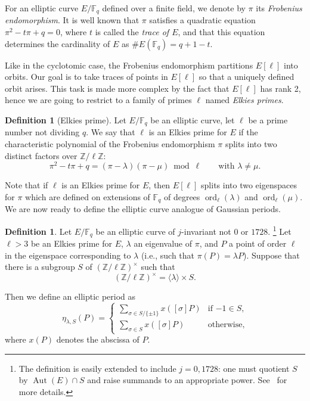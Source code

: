 \documentclass{mcom-l}
\theoremstyle{plain}
\theoremstyle{definition}
\newtheorem{definition}[theorem]{Definition}
\DeclareMathOperator{\order}{ord} %
\DeclareMathOperator{\Aut}{Aut}
\newcommand{\Z}{\ensuremath{\mathbb{Z}}}
\newcommand{\F}{\ensuremath{\mathbb{F}}}
\begin{document}
For an elliptic curve $E/\F_q$ defined over a finite field, we denote
by $\pi$ its \emph{Frobenius endomorphism}. It is well known that
$\pi$ satisfies a quadratic equation $\pi^2-t\pi+q=0$, where $t$ is
called the \emph{trace of $E$}, and that this equation determines the
cardinality of $E$ as $\#E(\F_q)=q+1-t$.

Like in the cyclotomic case, the Frobenius endomorphism partitions
$E[\ell]$ into orbits. Our goal is to take traces of points in
$E[\ell]$ so that a uniquely defined orbit arises. This task is made
more complex by the fact that $E[\ell]$ has rank 2, hence we are going
to restrict to a family of primes $\ell$ named \emph{Elkies primes}.

\begin{definition}[Elkies prime]
  Let $E/\F_q$ be an elliptic curve, let $\ell$ be a prime number not
  dividing $q$.  We say that $\ell$ is an Elkies prime for $E$ if the
  characteristic polynomial of the Frobenius endomorphism $\pi$ splits
  into two distinct factors over $\Z/\ell\Z$:
\begin{equation}
\pi^2-t\pi+q=(\pi-\lambda)(\pi-\mu)\bmod\ell
\qquad\text{with $\lambda\ne\mu$}.
\end{equation}
\end{definition}

Note that if $\ell$ is an Elkies prime for $E$, then $E[\ell]$ splits
into two eigenspaces for $\pi$ which are defined on extensions of
$\F_q$ of degrees $\order_\ell(\lambda)$ and $\order_\ell(\mu)$. We
are now ready to define the elliptic curve analogue of Gaussian
periods.

\begin{definition}
  \label{definition:ellperiod}
  Let $E/\F_q$ be an elliptic curve of $j$-invariant not $0$ or
  $1728$.%
  \footnote{The definition is easily extended to include $j=0,1728$:
    one must quotient $S$ by $\Aut(E)\cap S$ and raise summands to an
    appropriate power. See~\cite{ffisom-long} for more details.} %
  Let $\ell > 3$ be an Elkies prime for $E$, $\lambda$ an eigenvalue
  of $\pi$, and $P$ a point of order $\ell$ in the eigenspace
  corresponding to $\lambda$ (i.e., such that $\pi(P)=\lambda P$).
  Suppose that there is a subgroup $S$ of $(\Z/\ell\Z)^{\times}$ such
  that
  \begin{equation}
    (\Z/\ell\Z)^{\times} = \langle{\lambda}\rangle \times S.
  \end{equation}
  
  Then we define an elliptic period as
  \begin{equation}
    \eta_{\lambda,S}(P) =
    \begin{cases}
      \sum_{\sigma\in S/\{\pm1\}} {x \left([\sigma] P \right)} & \text{if $-1\in S$,}\\
      \sum_{\sigma\in S} {x \left([\sigma] P \right)} & \text{otherwise,}
    \end{cases}
  \end{equation}
  where $x(P)$ denotes the abscissa of $P$.
\end{definition}
\end{document}
